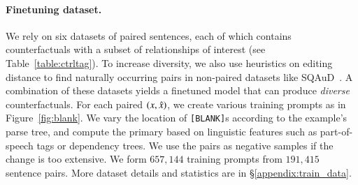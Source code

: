 
\paragraph{Finetuning dataset.}
We rely on six datasets of paired sentences, each of which contains counterfactuals with a subset of \relation{\xp} relationships of interest (see Table~\ref{table:ctrltag}). 
To increase diversity, we also use heuristics on editing distance to find naturally occurring pairs in non-paired datasets like SQAuD~\cite{rajpurkar-etal-2016-squad}.
A combination of these datasets yields a finetuned model that can produce \emph{diverse} counterfactuals.
For each paired $(x, \hat{x})$, we create various training prompts as in Figure~\ref{fig:blank}.
We vary the location of \texttt{[BLANK]}s according to the example's parse tree, and compute the primary \tagstrshort based on linguistic features such as part-of-speech tags or dependency trees.
We use the pairs as negative samples if the change is too extensive.
We form $657,144$ training prompts from $191,415$ sentence pairs. 
More dataset details and \tagstrshort statistics are in \S\ref{appendix:train_data}.




